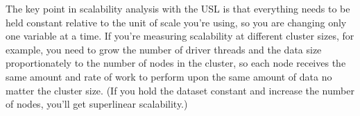 \documentclass{vivid_layout}
\begin{document}
The key point in scalability analysis with the USL is that everything needs to be held
constant relative to the unit of scale you're using, so you are changing only
one variable at a time. If you're measuring scalability at different cluster
sizes, for example, you need to grow the number of driver threads and the data
size proportionately to the number of nodes in the cluster, so each node
receives the same amount and rate of work to perform upon the same amount of
data no matter the cluster size. (If you hold the dataset constant and increase
the number of nodes, you'll get superlinear scalability.)

% 
% 
\end{document}
